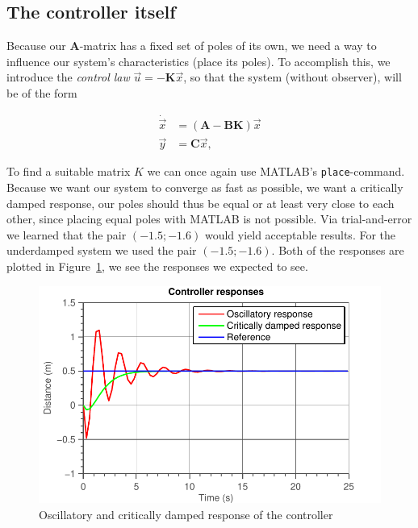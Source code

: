 \documentclass[11pt,titlepage]{report}
\begin{document}
\subsection{The controller itself}
Because our $\mathbf{A}$-matrix has a fixed set of poles of its own, we need a way to influence our system's characteristics (place its poles). To accomplish this, we introduce the \textit{control law} $\vec{u} = -\mathbf{K}\vec{x}$, so that the system (without observer), will be of the form

\begin{equation*}
	\begin{split}
		\dot{\vec{x}} &= (\mathbf{A}-\mathbf{B}\mathbf{K})\vec{x} \\
		\vec{y} &= \mathbf{C}\vec{x},
	\end{split}
\end{equation*}

To find a suitable matrix $K$ we can once again use MATLAB's \texttt{place}-command.
Because we want our system to converge as fast as possible, we want a critically damped response, our poles should thus be equal or at least very close to each other, since placing equal poles with MATLAB is not possible. Via trial-and-error we learned that the pair $(-1.5; -1.6)$ would yield acceptable results.
For the underdamped system we used the pair $(-1.5; -1.6)$. Both of the responses are plotted in Figure~\ref{fig:ass2-controller-response}, we see the responses we expected to see. %

\begin{figure}[H]
	\begin{center}
		\includegraphics[width=0.7\linewidth]{resource/controller.pdf}
	\end{center}
	\caption{Oscillatory and critically damped response of the controller}
	\label{fig:ass2-controller-response}
\end{figure}
\end{document}
